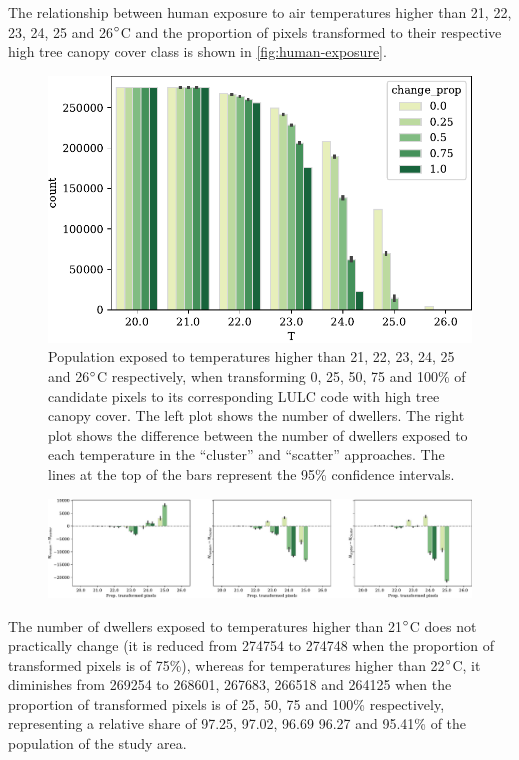 \documentclass[10pt,letterpaper]{article}
\begin{document}
The relationship between human exposure to air temperatures higher than 21, 22, 23, 24, 25 and 26$\degree$C and the proportion of pixels transformed to their respective high tree canopy cover class is shown in \autoref{fig:human-exposure}.
\begin{figure}[ht]
  \centering
  \includegraphics[width=.6\textwidth]{figures/human-exposure}
  \caption{\label{fig:human-exposure} Population exposed to temperatures higher than 21, 22, 23, 24, 25 and 26$\degree$C respectively, when transforming 0, 25, 50, 75 and 100\% of candidate pixels to its corresponding LULC code with high tree canopy cover. The left plot shows the number of dwellers. The right plot shows the difference between the number of dwellers exposed to each temperature in the ``cluster'' and ``scatter'' approaches. The lines at the top of the bars represent the 95\% confidence intervals.}
\end{figure}
\begin{figure}[ht]
  \begin{adjustwidth}{-.4\textwidth}{0cm}  
    \centering
    \includegraphics[width=\linewidth]{figures/human-exposure-comparison}
    \caption{\label{fig:human-exposure-comparison} }
  \end{adjustwidth}
\end{figure}
The number of dwellers exposed to temperatures higher than 21$\degree$C does not practically change (it is reduced from 274754 to 274748 when the proportion of transformed pixels is of 75\%), whereas for temperatures higher than 22$\degree$C, it diminishes from 269254 to 268601, 267683, 266518 and 264125 when the proportion of transformed pixels is of 25, 50, 75 and 100\% respectively, representing a relative share of 97.25, 97.02, 96.69 96.27 and 95.41\% of the population of the study area.
\end{document}
